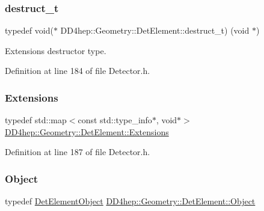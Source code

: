 \subsubsection{\texorpdfstring{destruct\+\_\+t}{destruct\_t}}
{\footnotesize\ttfamily typedef void($\ast$ D\+D4hep\+::\+Geometry\+::\+Det\+Element\+::destruct\+\_\+t) (void $\ast$)}



Extensions destructor type. 



Definition at line 184 of file Detector.\+h.

\hypertarget{class_d_d4hep_1_1_geometry_1_1_det_element_aa3651ed4a11789675607a06d2f6846ff}{}\label{class_d_d4hep_1_1_geometry_1_1_det_element_aa3651ed4a11789675607a06d2f6846ff} 
\subsubsection{\texorpdfstring{Extensions}{Extensions}}
{\footnotesize\ttfamily typedef std\+::map$<$const std\+::type\+\_\+info$\ast$, void$\ast$$>$ \hyperlink{class_d_d4hep_1_1_geometry_1_1_det_element_aa3651ed4a11789675607a06d2f6846ff}{D\+D4hep\+::\+Geometry\+::\+Det\+Element\+::\+Extensions}}



Definition at line 187 of file Detector.\+h.

\hypertarget{class_d_d4hep_1_1_geometry_1_1_det_element_a4e44e860d6e5827d9f42a4aea3a4f288}{}\label{class_d_d4hep_1_1_geometry_1_1_det_element_a4e44e860d6e5827d9f42a4aea3a4f288} 
\subsubsection{\texorpdfstring{Object}{Object}}
{\footnotesize\ttfamily typedef \hyperlink{class_d_d4hep_1_1_geometry_1_1_det_element_object}{Det\+Element\+Object} \hyperlink{class_d_d4hep_1_1_geometry_1_1_det_element_a4e44e860d6e5827d9f42a4aea3a4f288}{D\+D4hep\+::\+Geometry\+::\+Det\+Element\+::\+Object}}



